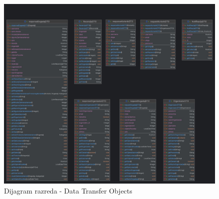 			\begin{figure}[H]
				\includegraphics[scale=0.4]{dijagramiKlasa/dijagramRazeda-DTO.jpg} %
				\centering
				\caption{Dijagram razreda - Data Transfer Objects}
				\label{fig:promjene}
			\end{figure}
			
